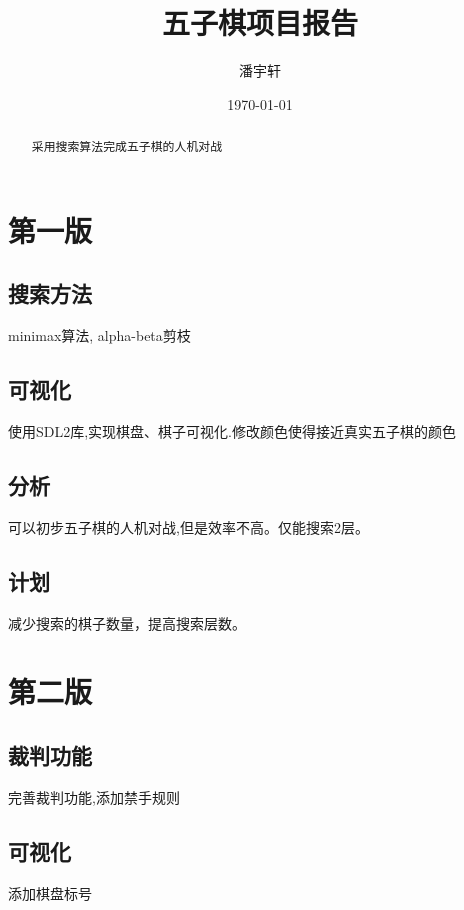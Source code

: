 \documentclass[a4paper,12pt]{ctexart}
\title{五子棋项目报告}
\author{潘宇轩}
\date{\today}
\begin{document}
\maketitle

\begin{abstract}
    采用搜索算法完成五子棋的人机对战
\end{abstract}

\tableofcontents
\section{第一版}

\subsection{搜索方法}

minimax算法, alpha-beta剪枝

\subsection{可视化}
使用SDL2库,实现棋盘、棋子可视化.修改颜色使得接近真实五子棋的颜色

\subsection{分析}
可以初步五子棋的人机对战,但是效率不高。仅能搜索2层。

\subsection{计划}
减少搜索的棋子数量，提高搜索层数。

\section{第二版}

\subsection{裁判功能}
完善裁判功能,添加禁手规则

\subsection{可视化}
添加棋盘标号
\end{document}
